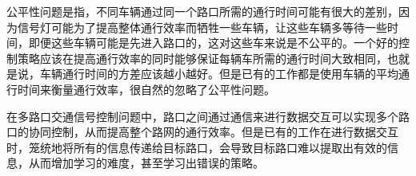 公平性问题是指，不同车辆通过同一个路口所需的通行时间可能有很大的差别，因为信号灯可能为了提高整体通行效率而牺牲一些车辆，让这些车辆多等待一些时间，即便这些车辆可能是先进入路口的，这对这些车来说是不公平的。一个好的控制策略应该在提高通行效率的同时能够保证每辆车所需的通行时间大致相同，也就是说，车辆通行时间的方差应该越小越好。但是已有的工作都是使用车辆的平均通行时间来衡量通行效率，很自然的忽略了公平性问题。

在多路口交通信号控制问题中，路口之间通过通信来进行数据交互可以实现多个路口的协同控制，从而提高整个路网的通行效率。但是已有的工作在进行数据交互时，笼统地将所有的信息传递给目标路口，会导致目标路口难以提取出有效的信息，从而增加学习的难度，甚至学习出错误的策略。